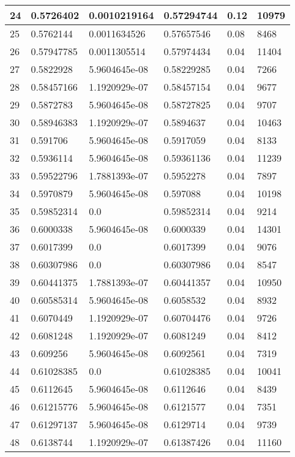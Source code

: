 \begin{longtable}{|l|l|l|l|l|l|}
24 & 0.5726402 & 0.0010219164 & 0.57294744 & 0.12 & 10979 \\ \hline 
25 & 0.5762144 & 0.0011634526 & 0.57657546 & 0.08 & 8468 \\ \hline 
26 & 0.57947785 & 0.0011305514 & 0.57974434 & 0.04 & 11404 \\ \hline 
27 & 0.5822928 & 5.9604645e-08 & 0.58229285 & 0.04 & 7266 \\ \hline 
28 & 0.58457166 & 1.1920929e-07 & 0.58457154 & 0.04 & 9677 \\ \hline 
29 & 0.5872783 & 5.9604645e-08 & 0.58727825 & 0.04 & 9707 \\ \hline 
30 & 0.58946383 & 1.1920929e-07 & 0.5894637 & 0.04 & 10463 \\ \hline 
31 & 0.591706 & 5.9604645e-08 & 0.5917059 & 0.04 & 8133 \\ \hline 
32 & 0.5936114 & 5.9604645e-08 & 0.59361136 & 0.04 & 11239 \\ \hline 
33 & 0.59522796 & 1.7881393e-07 & 0.5952278 & 0.04 & 7897 \\ \hline 
34 & 0.5970879 & 5.9604645e-08 & 0.597088 & 0.04 & 10198 \\ \hline 
35 & 0.59852314 & 0.0 & 0.59852314 & 0.04 & 9214 \\ \hline 
36 & 0.6000338 & 5.9604645e-08 & 0.6000339 & 0.04 & 14301 \\ \hline 
37 & 0.6017399 & 0.0 & 0.6017399 & 0.04 & 9076 \\ \hline 
38 & 0.60307986 & 0.0 & 0.60307986 & 0.04 & 8547 \\ \hline 
39 & 0.60441375 & 1.7881393e-07 & 0.60441357 & 0.04 & 10950 \\ \hline 
40 & 0.60585314 & 5.9604645e-08 & 0.6058532 & 0.04 & 8932 \\ \hline 
41 & 0.6070449 & 1.1920929e-07 & 0.60704476 & 0.04 & 9726 \\ \hline 
42 & 0.6081248 & 1.1920929e-07 & 0.6081249 & 0.04 & 8412 \\ \hline 
43 & 0.609256 & 5.9604645e-08 & 0.6092561 & 0.04 & 7319 \\ \hline 
44 & 0.61028385 & 0.0 & 0.61028385 & 0.04 & 10041 \\ \hline 
45 & 0.6112645 & 5.9604645e-08 & 0.6112646 & 0.04 & 8439 \\ \hline 
46 & 0.61215776 & 5.9604645e-08 & 0.6121577 & 0.04 & 7351 \\ \hline 
47 & 0.61297137 & 5.9604645e-08 & 0.6129714 & 0.04 & 9739 \\ \hline 
48 & 0.6138744 & 1.1920929e-07 & 0.61387426 & 0.04 & 11160 \\ \hline 

\end{longtable}
